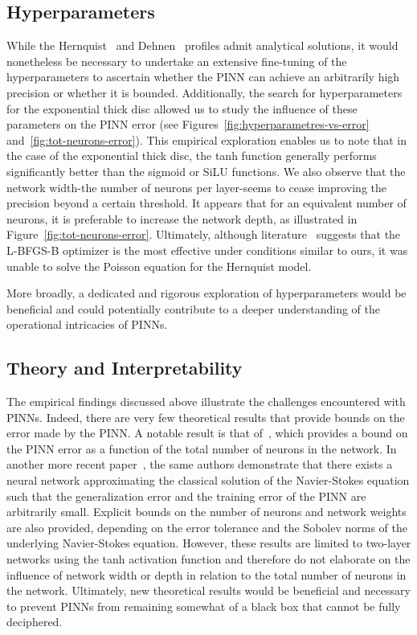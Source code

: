 \subsection{Hyperparameters}
While the Hernquist~\cite{hernquist_analytical_1990} and Dehnen~\cite{dehnen_family_1993} profiles admit analytical solutions, it would nonetheless be necessary to undertake an extensive fine-tuning of the hyperparameters to ascertain whether the PINN can achieve an arbitrarily high precision or whether it is bounded. Additionally, the search for hyperparameters for the exponential thick disc allowed us to study the influence of these parameters on the PINN error (see Figures~\ref{fig:hyperparametres-vs-error} and~\ref{fig:tot-neurons-error}). This empirical exploration enables us to note that in the case of the exponential thick disc, the tanh function generally performs significantly better than the sigmoid or SiLU functions. We also observe that the network width-the number of neurons per layer-seems to cease improving the precision beyond a certain threshold. It appears that for an equivalent number of neurons, it is preferable to increase the network depth, as illustrated in Figure~\ref{fig:tot-neurons-error}. Ultimately, although literature~\cite{he_physics-informed_2020} suggests that the L-BFGS-B optimizer is the most effective under conditions similar to ours, it was unable to solve the Poisson equation for the Hernquist model. 
\par More broadly, a dedicated and rigorous exploration of hyperparameters would be beneficial and could potentially contribute to a deeper understanding of the operational intricacies of PINNs.

\subsection{Theory and Interpretability}
The empirical findings discussed above illustrate the challenges encountered with PINNs. Indeed, there are very few theoretical results that provide bounds on the error made by the PINN. A notable result is that of~\cite{de_ryck_approximation_2021}, which provides a bound on the PINN error as a function of the total number of neurons in the network. In another more recent paper~\cite{de_ryck_error_2023}, the same authors demonstrate that there exists a neural network approximating the classical solution of the Navier-Stokes equation such that the generalization error and the training error of the PINN are arbitrarily small. Explicit bounds on the number of neurons and network weights are also provided, depending on the error tolerance and the Sobolev norms of the underlying Navier-Stokes equation. However, these results are limited to two-layer networks using the tanh activation function and therefore do not elaborate on the influence of network width or depth in relation to the total number of neurons in the network. Ultimately, new theoretical results would be beneficial and necessary to prevent PINNs from remaining somewhat of a black box that cannot be fully deciphered.

